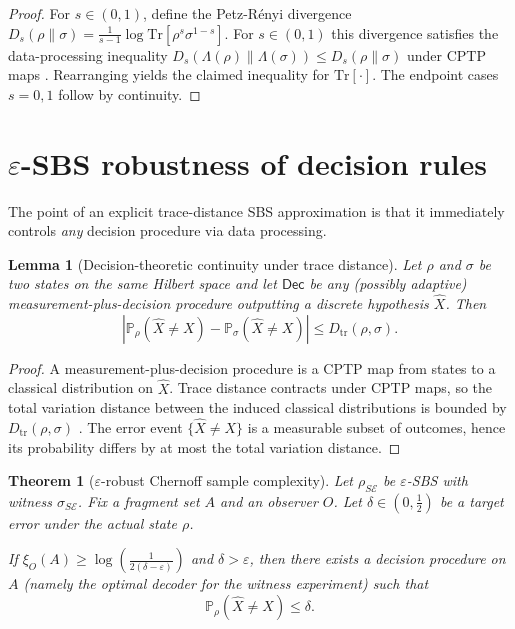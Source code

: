 \documentclass[11pt]{article}
\newcommand{\cE}{\mathcal{E}}
\newcommand{\Dtr}{D_{\mathrm{tr}}}
\newcommand{\Prob}{\mathbb{P}}
\newcommand{\1}{\mathbf{1}}
\newcommand{\QCBdist}{\xi}
\theoremstyle{definition}
\theoremstyle{plain}
\newtheorem{theorem}{Theorem}
\newtheorem{lemma}{Lemma}
\begin{document}
\begin{proof}
For $s\in(0,1)$, define the Petz-R\'enyi divergence
$D_s(\rho\|\sigma)=\frac{1}{s-1}\log \mathrm{Tr}[\rho^s\sigma^{1-s}]$.
For $s\in(0,1)$ this divergence satisfies the data-processing inequality
$D_s(\Lambda(\rho)\|\Lambda(\sigma))\le D_s(\rho\|\sigma)$ under CPTP maps \citep{Petz1986,MosonyiOgawa2015,Tomamichel2016}.
Rearranging yields the claimed inequality for $\mathrm{Tr}[\cdot]$.
The endpoint cases $s=0,1$ follow by continuity.
\end{proof}

\section{$\varepsilon$-SBS robustness of decision rules}

The point of an explicit trace-distance SBS approximation is that it immediately controls \emph{any} decision procedure via data processing.

\begin{lemma}[Decision-theoretic continuity under trace distance]
\label{lem:decision-cont}
Let $\rho$ and $\sigma$ be two states on the same Hilbert space and let $\mathsf{Dec}$ be any (possibly adaptive) measurement-plus-decision procedure outputting a discrete hypothesis $\widehat{X}$.
Then
\[
\left|\Prob_\rho(\widehat{X}\neq X)-\Prob_\sigma(\widehat{X}\neq X)\right|
\le \Dtr(\rho,\sigma).
\]
\end{lemma}

\begin{proof}
A measurement-plus-decision procedure is a CPTP map from states to a classical distribution on $\widehat{X}$.
Trace distance contracts under CPTP maps, so the total variation distance between the induced classical distributions is bounded by $\Dtr(\rho,\sigma)$ \citep{Watrous2018}.
The error event $\{\widehat{X}\neq X\}$ is a measurable subset of outcomes, hence its probability differs by at most the total variation distance.
\end{proof}

\begin{theorem}[$\varepsilon$-robust Chernoff sample complexity]
\label{thm:eps-robust}
Let $\rho_{S\cE}$ be $\varepsilon$-SBS with witness $\sigma_{S\cE}$.
Fix a fragment set $A$ and an observer $O$.
Let $\delta\in(0,\tfrac12)$ be a target error under the \emph{actual} state $\rho$.

If $\QCBdist_O(A)\ge \log\!\left(\frac{1}{2(\delta-\varepsilon)}\right)$ and $\delta>\varepsilon$, then there exists a decision procedure on $A$ (namely the optimal decoder for the witness experiment) such that
\[
\Prob_{\rho}(\widehat{X}\neq X)\le \delta.
\]
\end{theorem}
\end{document}
